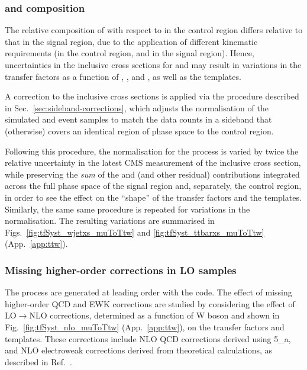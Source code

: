 \subsubsection{\texorpdfstring{\wj}{W+jets} and \texorpdfstring{\ttbar}{TTbar} composition}
\label{sec:tfSyst_ttW_composition}

The relative composition of \wj with respect to \ttbar in the \mj
control region differs relative to that in the signal region, due to
the application of different kinematic requirements (\eg \mt in the
control region, \alphat and \bdphi in the signal region). Hence,
uncertainties in the inclusive cross sections for \wj and \ttbar may
result in variations in the transfer factors as a function of \njet,
\scalht, and \nb, as well as the \HTmiss templates.

A correction to the inclusive cross sections is applied via the
procedure described in Sec.~\ref{sec:sideband-corrections}, which
adjusts the normalisation of the simulated \wj and \ttbar event
samples to match the data counts in a \HTmiss sideband that
(otherwise) covers an identical region of phase space to the \mj
control region.

Following this procedure, the normalisation for the \wj process is
varied by twice the relative uncertainty in the latest CMS measurement
of the inclusive cross section, while preserving the {\it sum} of the
\wj and \ttbar (and other residual) contributions integrated across
the full phase space of the signal region and, separately, the \mj
control region, in order to see the effect on the ``shape'' of the
transfer factors and the \HTmiss templates. Similarly, the same same
procedure is repeated for variations in the \ttbar normalisation. The
resulting variations are summarised in
Figs.~\ref{fig:tfSyst_wjetxs_muToTtw} and
\ref{fig:tfSyst_ttbarxs_muToTtw} (App.~\ref{app:ttw}). 

\subsubsection{Missing higher-order corrections in LO \texorpdfstring{\MADGRAPH}{MadGraph}
  samples}
\label{sec:nlo}

The \wj process are generated at leading order with the \MADGRAPH
code. The effect of missing higher-order QCD and EWK corrections are
studied by considering the effect of LO$\rightarrow$NLO corrections,
determined as a function of W boson \Pt and shown in
Fig.~\ref{fig:tfSyst_nlo_muToTtw} (App.~\ref{app:ttw}), on the
transfer factors and \HTmiss templates. These corrections include 
NLO QCD corrections derived using {\MADGRAPH{}5\_a\MCATNLO},
and NLO electroweak corrections derived from theoretical calculations,
as described in Ref.~\cite{monojet_AN_36fb}.

